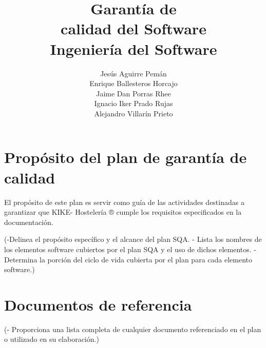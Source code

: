 \documentclass[spanish,a4paper,12pt, twoside]{report}	%
\begin{document}
\renewcommand{\chaptername}{Parte}			%
\renewcommand{\thechapter}{\Roman{chapter}}	%

\title{\textbf{\huge{Garantía de \\ 
	calidad del Software}} \\ \vspace{0.3cm}
	\Large{Ingeniería del Software}}
\author{ Jesús Aguirre Pemán \\
	 Enrique Ballesteros Horcajo \\
	 Jaime Dan Porras Rhee \\
	 Ignacio Iker Prado Rujas \\
	 Alejandro Villarín Prieto }
\date{\Today}
\maketitle

\newpage
\mbox{}
\thispagestyle{empty}						%
\newpage


\tableofcontents 							%

\newpage
\mbox{}
\thispagestyle{empty}						%
\newpage



\chapter{ Propósito del plan de garantía de calidad}
	El propósito de este plan es servir como guía de las actividades destinadas a garantizar que 
	KIKE- Hostelería ® cumple los requisitos especificados en la documentación.
	
	(-Delinea el propósito específico y el alcance del plan
	SQA.
	- Lista los nombres de los elementos software
	cubiertos por el plan SQA y el uso de dichos
	elementos.		
	- Determina la porción del ciclo de vida cubierta por
	el plan para cada elemento software.)

\newpage
\mbox{}
\thispagestyle{empty}						%
\newpage

\chapter{ Documentos de referencia}
	(- Proporciona una lista completa de cualquier
	documento referenciado en el plan o utilizado en su
	elaboración.)
\end{document}
